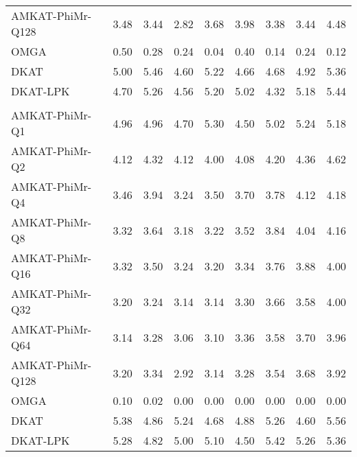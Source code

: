\documentclass[a4paper,oneside,10pt]{article}\usepackage[]{graphicx}\usepackage[]{color}
\newenvironment{knitrout}{}{} %
\begin{document}
\begin{knitrout}
\begin{table}
\begin{tabular}[t]{lrrrrrrrr}
\hspace{1em}AMKAT-PhiMr-Q128 & 3.48 & 3.44 & 2.82 & 3.68 & 3.98 & 3.38 & 3.44 & 4.48\\
\hspace{1em}OMGA & 0.50 & 0.28 & 0.24 & 0.04 & 0.40 & 0.14 & 0.24 & 0.12\\
\hspace{1em}DKAT & 5.00 & 5.46 & 4.60 & 5.22 & 4.66 & 4.68 & 4.92 & 5.36\\
\hspace{1em}DKAT-LPK & 4.70 & 5.26 & 4.56 & 5.20 & 5.02 & 4.32 & 5.18 & 5.44\\
\addlinespace[0.3em]
\multicolumn{9}{l}{\textbf{Multivariate Cauchy errors}}\\
\hspace{1em}AMKAT-PhiMr-Q1 & 4.96 & 4.96 & 4.70 & 5.30 & 4.50 & 5.02 & 5.24 & 5.18\\
\hspace{1em}AMKAT-PhiMr-Q2 & 4.12 & 4.32 & 4.12 & 4.00 & 4.08 & 4.20 & 4.36 & 4.62\\
\hspace{1em}AMKAT-PhiMr-Q4 & 3.46 & 3.94 & 3.24 & 3.50 & 3.70 & 3.78 & 4.12 & 4.18\\
\hspace{1em}AMKAT-PhiMr-Q8 & 3.32 & 3.64 & 3.18 & 3.22 & 3.52 & 3.84 & 4.04 & 4.16\\
\hspace{1em}AMKAT-PhiMr-Q16 & 3.32 & 3.50 & 3.24 & 3.20 & 3.34 & 3.76 & 3.88 & 4.00\\
\hspace{1em}AMKAT-PhiMr-Q32 & 3.20 & 3.24 & 3.14 & 3.14 & 3.30 & 3.66 & 3.58 & 4.00\\
\hspace{1em}AMKAT-PhiMr-Q64 & 3.14 & 3.28 & 3.06 & 3.10 & 3.36 & 3.58 & 3.70 & 3.96\\
\hspace{1em}AMKAT-PhiMr-Q128 & 3.20 & 3.34 & 2.92 & 3.14 & 3.28 & 3.54 & 3.68 & 3.92\\
\hspace{1em}OMGA & 0.10 & 0.02 & 0.00 & 0.00 & 0.00 & 0.00 & 0.00 & 0.00\\
\hspace{1em}DKAT & 5.38 & 4.86 & 5.24 & 4.68 & 4.88 & 5.26 & 4.60 & 5.56\\
\hspace{1em}DKAT-LPK & 5.28 & 4.82 & 5.00 & 5.10 & 4.50 & 5.42 & 5.26 & 5.36\\
\bottomrule
\end{tabular}
\end{table}

\end{knitrout}
\end{document}
